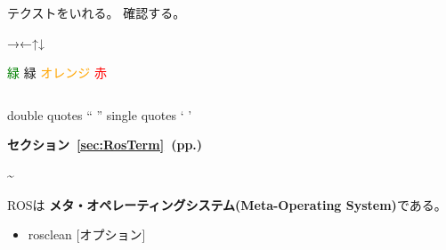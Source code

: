\setcounter{num}{0}

\vspace{\baselineskip}
\noindent
{}
\thenum


\setcounter{num}{0}
\vspace{\baselineskip}
\noindent
{}\circled{\thenum} テクストをいれる。
\circled{\thenum} 確認する。


→←↑↓

\textcolor{green}{緑}
{\color{limegreen}緑}
\textcolor{orange}{オレンジ}
\textcolor{red}{赤}


\vspace{\baselineskip}
\begin{lstlisting}[language=ROS]
%*〜省略〜*)
\end{lstlisting}


double quotes
`` ''
single quotes
` '

\begin{exercise}[ROSシェルコマンドを使用できる環境]
\end{exercise}

\setcounter{num}{0}

\circled{\thenum}

\cite{book_key}

\textbf{セクション~\ref{sec:RosTerm}~(pp.\pageref{sec:RosTerm})}

\textasciitilde

\begin{center}
ROSは \textbf{メタ・オペレーティングシステム(Meta-Operating System)}である。
\end{center}

\begin{itemize}
\item  rosclean [オプション]
\end{itemize}

\vspace{\baselineskip}
\noindent
\begin{description}
\item[]
\end{description}

